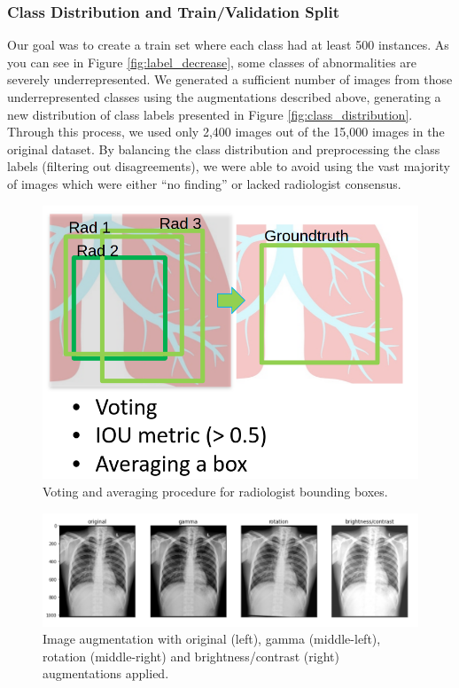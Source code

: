 \documentclass[conference]{IEEEtran}
\begin{document}
\subsubsection{Class Distribution and Train/Validation Split}
Our goal was to create a train set where each class had at least 500 instances. As you can see in Figure \ref{fig:label_decrease}, some classes of abnormalities are severely underrepresented. We generated a sufficient number of images from those underrepresented classes using the augmentations described above, generating a new distribution of class labels presented in Figure \ref{fig:class_distribution}. Through this process, we used only 2,400 images out of the 15,000 images in the original dataset. By balancing the class distribution and preprocessing the class labels (filtering out disagreements), we were able to avoid using the vast majority of images which were either “no finding” or lacked radiologist consensus. 

\begin{figure}[h]
	\centering
    \includegraphics[width=0.80\linewidth]{radiologist_voting}
    \caption{Voting and averaging procedure for radiologist bounding boxes.}
	\label{fig:radiologist_voting}
\end{figure}

\begin{figure}[h]
	\centering
    \includegraphics[width=0.80\linewidth]{img_preprocessing_aug}
    \caption{Image augmentation with original (left), gamma (middle-left), rotation (middle-right) and brightness/contrast (right) augmentations applied.}
	\label{fig:img_preprocessing_aug}
\end{figure}
\end{document}
